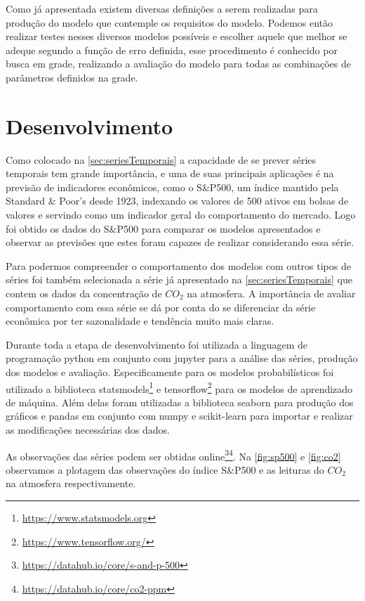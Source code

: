 \documentclass[
    12pt,
    oneside,
    a4paper,
    english,
    brazil
]{abntex2}
\begin{document}
Como  já  apresentada  existem  diversas definições  a  serem  realizadas  para
produção  do  modelo que  contemple  os  requisitos  do modelo.  Podemos  então
realizar testes nesses diversos modelos  possíveis e escolher aquele que melhor
se adeque segundo a função de  erro definida, esse procedimento é conhecido por
busca em grade,  realizando a avaliação do modelo para  todas as combinações de
parâmetros definidos na grade.

\chapter{Desenvolvimento}\label{chap:desenv}
Como colocado na \autoref{sec:seriesTemporais} a capacidade de se prever séries temporais tem  grande importância,  e uma  de suas  principais aplicações  é na
previsão  de indicadores  econômicos, como  o S\&P500,  um índice  mantido pela
Standard \& Poor's desde 1923, indexando os  valores de 500 ativos em bolsas de
valores e  servindo como um indicador  geral do comportamento do  mercado. Logo
foi obtido os dados do S\&P500 para comparar os modelos apresentados e observar
as previsões que estes foram capazes de realizar considerando essa série.

Para   podermos   compreender   o   comportamento  dos   modelos   com   outros
tipos   de  séries   foi  também   selecionada  a   série  já   apresentado  na
\autoref{sec:seriesTemporais} que contem os dados  da concentração de $CO_2$ na
atmosfera. A  importância de  avaliar comportamento  com essa  série se  dá por
conta do  se diferenciar da  série econômica  por ter sazonalidade  e tendência
muito mais claras.

Durante  toda  a  etapa  de   desenvolvimento  foi  utilizada  a  linguagem  de
programação python em conjunto com jupyter  para a análise das séries, produção
dos modelos  e avaliação. Especificamente  para os modelos  probabilísticos foi
utilizado a  biblioteca statsmodels\footnote{\url{https://www.statsmodels.org}}
e  tensorflow\footnote{\url{https://www.tensorflow.org/}}  para os  modelos  de
aprendizado de máquina.  Além delas foram utilizadas a  biblioteca seaborn para
produção  dos gráficos  e  pandas em  conjunto com  numpy  e scikit-learn  para
importar e realizar as modificações necessárias dos dados.

As observações das séries podem ser obtidas
online\footnote{\url{https://datahub.io/core/s-and-p-500}}\footnote{\url{https://datahub.io/core/co2-ppm}}.
Na   \autoref{fig:sp500}  e   \autoref{fig:co2}  observamos   a  plotagem   das
observações  do   índice  S\&P500  e   as  leituras  do  $CO_2$   na  atmosfera
respectivamente.
\end{document}
